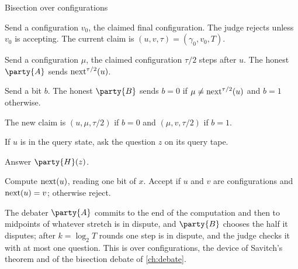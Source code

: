 \begin{refsection}
\begin{protocol}{Bisection over configurations}\label{prot:efficientdebate:bisection}
\item[\msg{A}{V}] Send a configuration $v_0$, the claimed final configuration. The judge rejects unless $v_0$ is accepting. The current claim is $(u,v,\tau)=(\gamma_0,v_0,T)$.
\item[\msg{A}{V}] Send a configuration $\mu$, the claimed configuration $\tau/2$ steps after $u$. The honest $\party{A}$ sends $\operatorname{next}^{\tau/2}(u)$.
\item[\msg{B}{V}] Send a bit $b$. The honest $\party{B}$ sends $b=0$ if $\mu\ne\operatorname{next}^{\tau/2}(u)$ and $b=1$ otherwise.
\item[\act{V}] The new claim is $(u,\mu,\tau/2)$ if $b=0$ and $(\mu,v,\tau/2)$ if $b=1$.
\item[\msg{V}{H}] If $u$ is in the query state, ask the question $z$ on its query tape.
\item[\msg{H}{V}] Answer $\party{H}(z)$.
\item[\act{V}] Compute $\operatorname{next}(u)$, reading one bit of $x$. Accept if $u$ and $v$ are configurations and $\operatorname{next}(u)=v$; otherwise reject.
\end{protocol}

The debater $\party{A}$ commits to the end of the computation and then to midpoints of whatever stretch is in dispute, and $\party{B}$ chooses the half it disputes; after $k=\log_2T$ rounds one step is in dispute, and the judge checks it with at most one question. This is  over configurations, the device of Savitch's theorem \parencite{Savitch1970} and of the bisection debate of \cref{ch:debate}.


\end{refsection}
